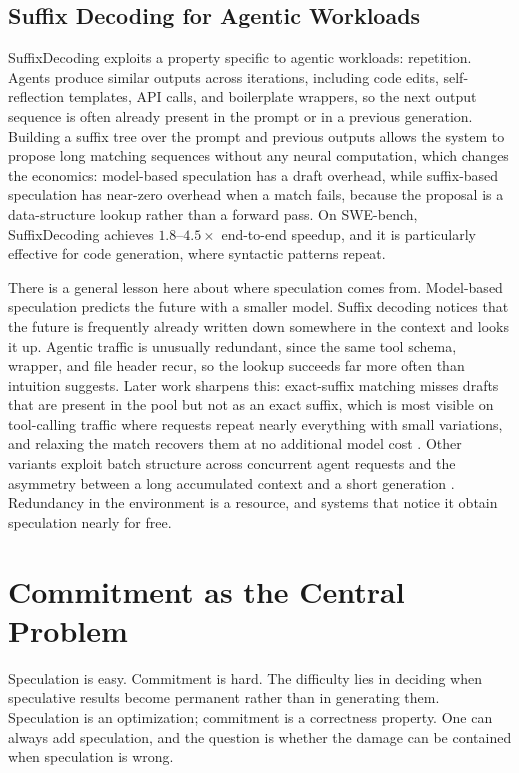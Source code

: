 \documentclass[11pt]{book}
\begin{document}
\subsection{Suffix Decoding for Agentic Workloads}

SuffixDecoding \cite{wang2024suffixdecoding} exploits a property specific to agentic workloads: repetition. Agents produce similar outputs across iterations, including code edits, self-reflection templates, API calls, and boilerplate wrappers, so the next output sequence is often already present in the prompt or in a previous generation. Building a suffix tree over the prompt and previous outputs allows the system to propose long matching sequences without any neural computation, which changes the economics: model-based speculation has a draft overhead, while suffix-based speculation has near-zero overhead when a match fails, because the proposal is a data-structure lookup rather than a forward pass. On SWE-bench, SuffixDecoding achieves $1.8$--$4.5\times$ end-to-end speedup, and it is particularly effective for code generation, where syntactic patterns repeat.

There is a general lesson here about where speculation comes from. Model-based speculation predicts the future with a smaller model. Suffix decoding notices that the future is frequently already written down somewhere in the context and looks it up. Agentic traffic is unusually redundant, since the same tool schema, wrapper, and file header recur, so the lookup succeeds far more often than intuition suggests. Later work sharpens this: exact-suffix matching misses drafts that are present in the pool but not as an exact suffix, which is most visible on tool-calling traffic where requests repeat nearly everything with small variations, and relaxing the match recovers them at no additional model cost \cite{oilbird2026}. Other variants exploit batch structure across concurrent agent requests \cite{agentspec2026} and the asymmetry between a long accumulated context and a short generation \cite{asymspec2026}. Redundancy in the environment is a resource, and systems that notice it obtain speculation nearly for free.

\section{Commitment as the Central Problem}

Speculation is easy. Commitment is hard. The difficulty lies in deciding when speculative results become permanent rather than in generating them. Speculation is an optimization; commitment is a correctness property. One can always add speculation, and the question is whether the damage can be contained when speculation is wrong.
\end{document}
